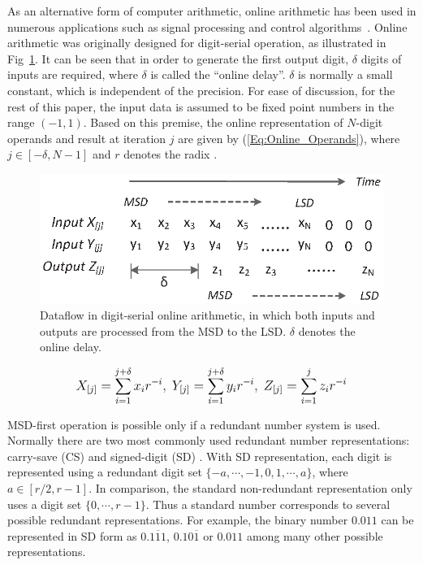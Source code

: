 \documentclass[10pt, conference, compsocconf]{IEEEtran}
\begin{document}
As an alternative form of computer arithmetic, online arithmetic has been used in numerous applications such as signal processing and control algorithms~\cite{Online_FPGADSP,Online_Control}. Online arithmetic was originally designed for digit-serial operation, as illustrated in Fig~\ref{Fig:OnlineDataFlow}. It can be seen that in order to generate the first output digit, $\delta$ digits of inputs are required, where $\delta$ is called the ``online delay''. $\delta$ is normally a small constant, which is independent of the precision. For ease of discussion, for the rest of this paper, the input data is assumed to be fixed point numbers in the range $(-1,1)$. Based on this premise, the online representation of $N$-digit operands and result at iteration $j$ are given by (\ref{Eq:Online_Operands}), where $j\in[-\delta,N-1]$ and $r$ denotes the radix \cite{Ercegovac_Book}.
%
\begin{figure}[tbp]
  \centering
  \includegraphics[width=.42\textwidth]{./figures/OnlineArithmetic_DataFlow.eps}
  \caption{Dataflow in digit-serial online arithmetic, in which both inputs and outputs are processed from the MSD to the LSD. $\delta$ denotes the online delay.}
  \vspace{-2ex}
  \label{Fig:OnlineDataFlow}
\end{figure}
%
\begin{eqnarray}\label{Eq:Online_Operands}
\footnotesize
  X_{[j]}=\sum_{i=1}^{j+\delta}x_ir^{-i},~Y_{[j]}=\sum_{i=1}^{j+\delta}y_ir^{-i},~Z_{[j]}=\sum_{i=1}^{j}z_ir^{-i}
\normalsize
\end{eqnarray}

MSD-first operation is possible only if a redundant number system is used. Normally there are two most commonly used redundant number representations: carry-save (CS) \cite{CSadder} and signed-digit (SD) \cite{RedundantNumber}. With SD representation, each digit is represented using a redundant digit set $\{-a, \cdots,-1,0, 1, \cdots, a\}$, where $a\in[r/2,r-1]$. In comparison, the standard non-redundant representation only uses a digit set $\{0,\cdots,r-1\}$. Thus a standard number corresponds to several possible redundant representations. For example, the binary number $0.011$ can be represented in SD form as $0.1\overline{1}1$, $0.10\overline{1}$ or $0.011$ among many other possible representations.
\end{document}
